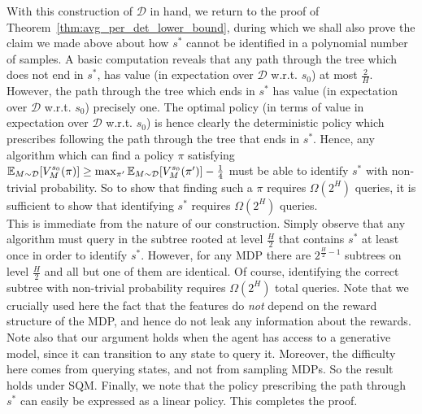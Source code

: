 \documentclass[11pt,twoside]{article}
\begin{document}
\noindent With this construction of $\mathcal{D}$ in hand, we return to the proof of Theorem~\ref{thm:avg_per_det_lower_bound}, during which we shall also prove the claim we made above about how $s^*$ cannot be identified in a polynomial number of samples. A basic computation reveals that any path through the tree which does not end in $s^*$, has value (in expectation over $\mathcal{D}$ w.r.t. $s_0$) at most $\frac{2}{H}$. However, the path through the tree which ends in $s^*$ has value (in expectation over $\mathcal{D}$ w.r.t. $s_0$) precisely one. The optimal policy (in terms of value in expectation over $\mathcal{D}$ w.r.t. $s_0$) is hence clearly the deterministic policy which prescribes following the path through the tree that ends in $s^*$. Hence, any algorithm which can find a policy $\pi$ satisfying $\operatorname{\mathbb{E}}_{M \sim \mathcal{D}} [V^{{s_0 }}_{{M }}({\pi})] \geq \max_{\pi'} \operatorname{\mathbb{E}}_{M \sim \mathcal{D}} [V^{{s_0 }}_{{M }}({\pi'})] - \frac{1}{4}$ must be able to identify $s^*$ with non-trivial probability. So to show that finding such a $\pi$ requires $\Omega(2^H)$ queries, it is sufficient to show that identifying $s^*$ requires $\Omega(2^H)$ queries. \\

\noindent This is immediate from the nature of our construction. Simply observe that any algorithm must query in the subtree rooted at level $\frac{H}{2}$ that contains $s^*$ at least once in order to identify $s^*$. However, for any MDP there are $2^{\frac{H}{2} - 1}$ subtrees on level $\frac{H}{2}$ and all but one of them are identical. Of course, identifying the correct subtree with non-trivial probability requires $\Omega(2^H)$ total queries. Note that we crucially used here the fact that the features do \emph{not} depend on the reward structure of the MDP, and hence do not leak any information about the rewards. Note also that our argument holds when the agent has access to a generative model, since it can transition to any state to query it. Moreover, the difficulty here comes from querying states, and not from sampling MDPs. So the result holds under SQM. Finally, we note that the policy prescribing the path through $s^*$ can easily be expressed as a linear policy. This completes the proof.
\end{document}
